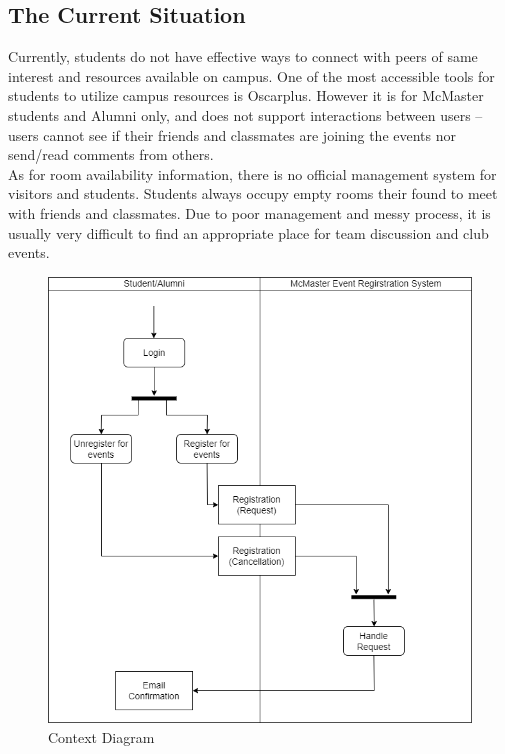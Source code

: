 \documentclass[12pt]{article}
\begin{document}
\subsection{The Current Situation}
Currently, students do not have effective ways to connect with peers of same interest and resources available on campus.  One of the most accessible tools for students to utilize campus resources is Oscarplus. However it is for McMaster students and Alumni only,  and does not support interactions between users -- users cannot see if their friends and classmates are joining the events nor send/read comments from others. \\
As for room availability information,  there is no official management system for visitors and students.  Students always occupy empty rooms their found to meet with friends and classmates.  Due to poor management and messy process,  it is usually very difficult to find an appropriate place for team discussion and club events.
\begin{figure}[H]
\begin{center}
\includegraphics[scale=0.5]{Current_Situation.png}
\end{center}
\caption{Context Diagram}
\end{figure}
\end{document}
